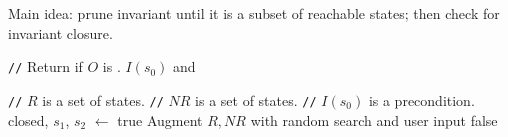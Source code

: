 \begin{center}
  \Large
  Main idea: prune invariant until it is a subset of reachable states; then
  check for invariant closure.
\end{center}

\newcommand{\algocomment}[1]{\State \textcolor{flatdenim}{\texttt{//} #1}}

\begin{algorithmic}
  \algocomment{Return if $O$ is \sTIconfluent{}.}
    \State
    \Return $I(s_0)$ and
  \EndFunction

  \State

  \algocomment{$R$ is a set of \sTIreachable{} states.}
  \algocomment{$NR$ is a set of \sTIunreachable{} states.}
  \algocomment{$I(s_0)$ is a precondition.}
    \State closed, $s_1$, $s_2$ $\gets$ 
      \Return true
    \EndIf
    \State Augment $R, NR$ with random search and user input
      \Return false
    \EndIf
    \State \Return {}
  \EndFunction
\end{algorithmic}
